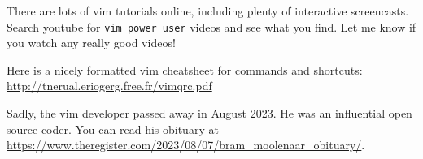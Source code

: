 \documentclass{article}
\begin{document}
There are lots of vim tutorials online, including plenty of interactive screencasts. Search youtube for \texttt{vim power user} videos and see what you find. Let me know if you watch any really good videos!

Here is a nicely formatted vim cheatsheet for commands and shortcuts:
\url{http://tnerual.eriogerg.free.fr/vimqrc.pdf}

Sadly, the vim developer passed away in August 2023. He was an influential open source coder. You can read his obituary at \url{https://www.theregister.com/2023/08/07/bram_moolenaar_obituary/}.
\end{document}
